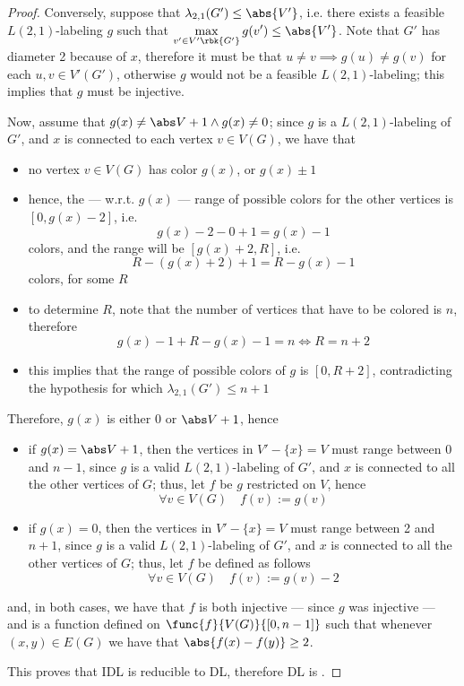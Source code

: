 \documentclass[a4paper, 12pt]{report}
\begin{document}
\begin{proof}
        Conversely, suppose that $\lambda_{2,1}(G') \le \abs{V'}$, i.e. there exists a feasible $L(2,1)$-labeling $g$ such that $\displaystyle \max_{v ' \in V'\rbk{G'}}{g(v')} \le \abs{V'}$. Note that $G'$ has diameter 2 because of $x$, therefore it must be that $u \neq v \implies g(u) \neq g(v)$ for each $u, v \in V'(G')$, otherwise $g$ would not be a feasible $L(2,1)$-labeling; this implies that $g$ must be injective.

        Now, assume that $g(x) \neq \abs V + 1 \land g(x) \neq 0$; since $g$ is a $L(2,1)$-labeling of $G'$, and $x$ is connected to each vertex $v \in V(G)$, we have that

        \begin{itemize}
            \item no vertex $v \in V(G)$ has color $g(x)$, or $g(x) \pm 1$
            \item hence, the  --- w.r.t. $g(x)$ --- range of possible colors for the other vertices is $[0, g(x) - 2]$, i.e. $$g(x) - 2 - 0 + 1 = g(x) - 1$$ colors, and the  range will be $[g(x) + 2, R]$, i.e. $$R - (g(x) + 2) + 1= R - g(x) - 1$$ colors, for some $R$
            \item to determine $R$, note that the number of vertices that have to be colored is $n$, therefore $$g(x) - 1 + R - g(x) - 1 = n \iff R = n + 2$$
            \item this implies that the range of possible colors of $g$ is $[0, R + 2]$, contradicting the hypothesis for which $\lambda_{2,1}(G') \le n + 1$
        \end{itemize}

        Therefore, $g(x)$ is either 0 or $\abs V + 1$, hence

        \begin{itemize}
            \item if $g(x) = \abs V + 1$, then the vertices in $V' - \{x\} = V$ must range between 0 and $n - 1$, since $g$ is a valid $L(2,1)$-labeling of $G'$, and $x$ is connected to all the other vertices of $G$; thus, let $f$ be $g$ restricted on $V$, hence $$\forall v \in V(G) \quad f(v) := g(v)$$
            \item if $g(x) = 0$, then the vertices in $V' - \{x\} = V$ must range between 2 and $n + 1$, since $g$ is a valid $L(2,1)$-labeling of $G'$, and $x$ is connected to all the other vertices of $G$; thus, let $f$ be defined as follows $$\forall v \in V(G) \quad f(v) := g(v) - 2$$
        \end{itemize}

        and, in both cases, we have that $f$ is both injective --- since $g$ was injective --- and is a function defined on $\func{f}{V(G)}{[0, n - 1]}$ such that whenever $(x, y) \in E(G)$ we have that $\abs{f(x) -f(y)} \ge 2$.

        This proves that IDL is reducible to DL, therefore DL is \NPComplete.
    \end{proof}
\end{document}
